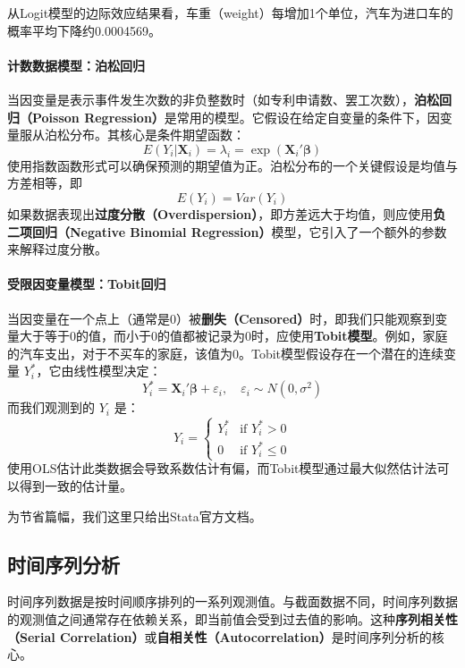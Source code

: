 从Logit模型的边际效应结果看，车重（weight）每增加1个单位，汽车为进口车的概率平均下降约0.0004569。

\paragraph*{计数数据模型：泊松回归}
当因变量是表示事件发生次数的非负整数时（如专利申请数、罢工次数），\textbf{泊松回归（Poisson Regression）}是常用的模型。它假设在给定自变量的条件下，因变量服从泊松分布。其核心是条件期望函数：
\begin{equation}
E(Y_i | \mathbf{X}_i) = \lambda_i = \exp(\mathbf{X}_i'\boldsymbol{\beta})
\end{equation}
使用指数函数形式可以确保预测的期望值为正。泊松分布的一个关键假设是均值与方差相等，即
\[
E(Y_i)=Var(Y_i)
\]
如果数据表现出\textbf{过度分散（Overdispersion）}，即方差远大于均值，则应使用\textbf{负二项回归（Negative Binomial Regression）}模型，它引入了一个额外的参数来解释过度分散。

\paragraph*{受限因变量模型：Tobit回归}
当因变量在一个点上（通常是0）被\textbf{删失（Censored）}时，即我们只能观察到变量大于等于0的值，而小于0的值都被记录为0时，应使用\textbf{Tobit模型}。例如，家庭的汽车支出，对于不买车的家庭，该值为0。Tobit模型假设存在一个潜在的连续变量 $Y_i^*$，它由线性模型决定：
\begin{equation}
Y_i^* = \mathbf{X}_i'\boldsymbol{\beta} + \varepsilon_i, \quad \varepsilon_i \sim N(0, \sigma^2)
\end{equation}
而我们观测到的 $Y_i$ 是：
\begin{equation}
Y_i =
\begin{cases}
Y_i^* & \text{if } Y_i^* > 0 \\
0 & \text{if } Y_i^* \leq 0
\end{cases}
\end{equation}
使用OLS估计此类数据会导致系数估计有偏，而Tobit模型通过最大似然估计法可以得到一致的估计量。

为节省篇幅，我们这里只给出Stata官方文档。

\subsection{时间序列分析}
时间序列数据是按时间顺序排列的一系列观测值。与截面数据不同，时间序列数据的观测值之间通常存在依赖关系，即当前值会受到过去值的影响。这种\textbf{序列相关性（Serial Correlation）}或\textbf{自相关性（Autocorrelation）}是时间序列分析的核心。

